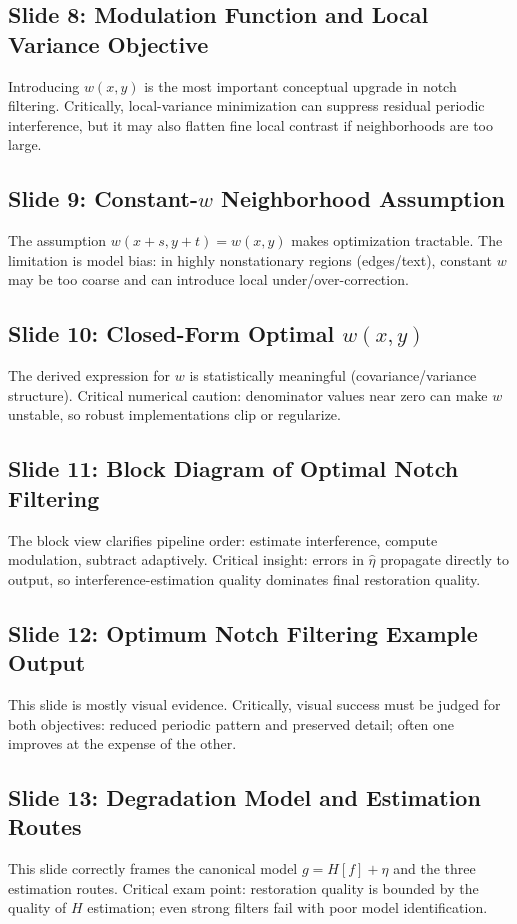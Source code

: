\documentclass[12pt,a4paper]{article}
\begin{document}
\subsection{Slide 8: Modulation Function and Local Variance Objective}
Introducing $w(x,y)$ is the most important conceptual upgrade in notch filtering. Critically, local-variance minimization can suppress residual periodic interference, but it may also flatten fine local contrast if neighborhoods are too large.

\subsection{Slide 9: Constant-$w$ Neighborhood Assumption}
The assumption $w(x+s,y+t)=w(x,y)$ makes optimization tractable. The limitation is model bias: in highly nonstationary regions (edges/text), constant $w$ may be too coarse and can introduce local under/over-correction.

\subsection{Slide 10: Closed-Form Optimal $w(x,y)$}
The derived expression for $w$ is statistically meaningful (covariance/variance structure). Critical numerical caution: denominator values near zero can make $w$ unstable, so robust implementations clip or regularize.

\subsection{Slide 11: Block Diagram of Optimal Notch Filtering}
The block view clarifies pipeline order: estimate interference, compute modulation, subtract adaptively. Critical insight: errors in $\hat{\eta}$ propagate directly to output, so interference-estimation quality dominates final restoration quality.

\subsection{Slide 12: Optimum Notch Filtering Example Output}
This slide is mostly visual evidence. Critically, visual success must be judged for both objectives: reduced periodic pattern and preserved detail; often one improves at the expense of the other.

\subsection{Slide 13: Degradation Model and Estimation Routes}
This slide correctly frames the canonical model $g=H[f]+\eta$ and the three estimation routes. Critical exam point: restoration quality is bounded by the quality of $H$ estimation; even strong filters fail with poor model identification.
\end{document}
